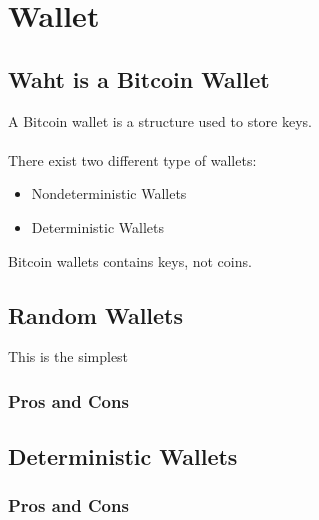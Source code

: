 
\chapter{Wallet} %

\label{bip32} %



\section{Waht is a Bitcoin Wallet}

A Bitcoin wallet is a structure used to store keys. \\ \\
There exist two different type of wallets:
\begin{itemize}
	\item Nondeterministic Wallets
	\item Deterministic Wallets
\end{itemize}
\begin{remark}
	Bitcoin wallets contains keys, not coins.
\end{remark}

\section{Random Wallets}
This is the simplest 
\subsection{Pros and Cons}

\section{Deterministic Wallets}

\subsection{Pros and Cons}

